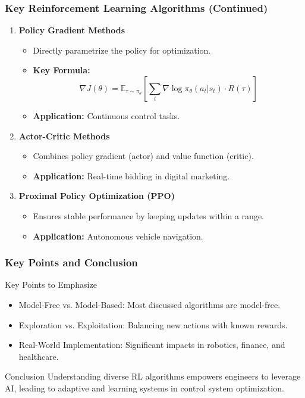 \documentclass[aspectratio=169]{beamer}
\begin{document}
\begin{frame}[fragile]
    \frametitle{Key Reinforcement Learning Algorithms (Continued)}
    \begin{enumerate}[resume]
        \item \textbf{Policy Gradient Methods}
            \begin{itemize}
                \item Directly parametrize the policy for optimization.
                \item \textbf{Key Formula:}
                \begin{equation}
                    \nabla J(\theta) = \mathbb{E}_{\tau \sim \pi_{\theta}} \left[ \sum_{t} \nabla \log \pi_{\theta}(a_t | s_t) \cdot R(\tau) \right]
                \end{equation}
                \item \textbf{Application:} Continuous control tasks.
            \end{itemize}

        \item \textbf{Actor-Critic Methods}
            \begin{itemize}
                \item Combines policy gradient (actor) and value function (critic).
                \item \textbf{Application:} Real-time bidding in digital marketing.
            \end{itemize}

        \item \textbf{Proximal Policy Optimization (PPO)}
            \begin{itemize}
                \item Ensures stable performance by keeping updates within a range.
                \item \textbf{Application:} Autonomous vehicle navigation.
            \end{itemize}
    \end{enumerate}
\end{frame}

\begin{frame}[fragile]
    \frametitle{Key Points and Conclusion}
    \begin{block}{Key Points to Emphasize}
        \begin{itemize}
            \item Model-Free vs. Model-Based: Most discussed algorithms are model-free.
            \item Exploration vs. Exploitation: Balancing new actions with known rewards.
            \item Real-World Implementation: Significant impacts in robotics, finance, and healthcare.
        \end{itemize}
    \end{block}

    \begin{block}{Conclusion}
        Understanding diverse RL algorithms empowers engineers to leverage AI, leading to adaptive and learning systems in control system optimization.
    \end{block}
\end{frame}
\end{document}
